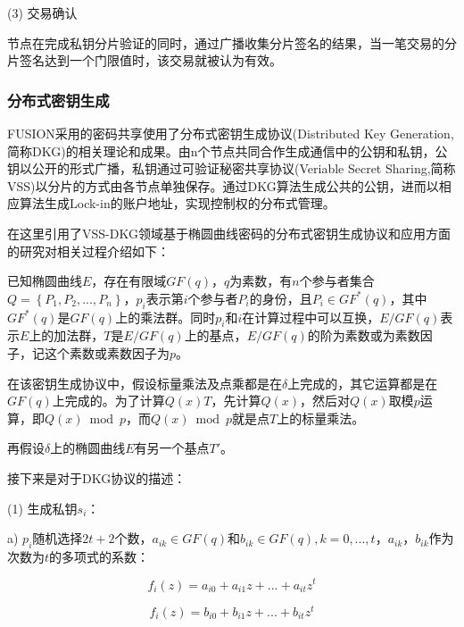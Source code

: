 \documentclass[a4paper,12pt]{article}
\begin{document}
(3) 交易确认

节点在完成私钥分片验证的同时，通过广播收集分片签名的结果，当一笔交易的分片签名达到一个门限值时，该交易就被认为有效。

\subsubsection{分布式密钥生成}

FUSION采用的密码共享\citep{Feldman1987}使用了分布式密钥生成协议(Distributed Key Generation,简称DKG)的相关理论和成果。由n个节点共同合作生成通信中的公钥和私钥，公钥以公开的形式广播，私钥通过可验证秘密共享协议(Veriable Secret Sharing,简称VSS)以分片的方式由各节点单独保存。通过DKG算法生成公共的公钥，进而以相应算法生成Lock-in的账户地址，实现控制权的分布式管理。

在这里引用了VSS-DKG领域基于椭圆曲线密码的分布式密钥生成协议和应用\citep{Wang2007}方面的研究对相关过程介绍如下：

已知椭圆曲线$E$，存在有限域$GF(q)$，$q$为素数，有$n$个参与者集合$Q = \left\{ {{P_1},{P_2},...,{P_n}} \right\}$，${p_i}$表示第$i$个参与者$P_{i}$的身份，且${P_i} \in G{F^*}\left( q \right)$，其中$G{F^*}\left( q \right)$是$GF\left( q \right)$上的乘法群。同时${p_i}$和$i$在计算过程中可以互换，$E/GF\left( q \right)$表示$E$上的加法群，$T$是$E/GF\left( q \right)$上的基点，$E/GF\left( q \right)$的阶为素数或为素数因子，记这个素数或素数因子为$p$。

在该密钥生成协议中，假设标量乘法及点乘都是在$\delta $上完成的，其它运算都是在$GF\left( q \right)$上完成的。为了计算$Q\left( x \right)T$，先计算$Q\left( x \right)$，然后对$Q\left( x \right)$取模$p$运算，即$Q\left( x \right)\bmod p$，而$Q\left( x \right)\bmod p$就是点$T$上的标量乘法。

再假设$\delta $上的椭圆曲线$E$有另一个基点$T'$。

接下来是对于DKG协议的描述：

(1) 生成私钥${s_i}$：

a) $p_{i}$随机选择$2t+2$个数，$a_{ik}\in GF(q)$和$b_{ik}\in GF(q), k=0,...,t$，$a_{ik}$，$b_{ik}$作为次数为$t$的多项式的系数：

\begin{equation}
  \label{eq:TA}
  f_i(z)=a_{i0}+a_{i1}z+...+a_{it}z^t
\end{equation}

\begin{equation}
  \label{eq:TA}
  f_i(z)=b_{i0}+b_{i1}z+...+b_{it}z^t
\end{equation}
\end{document}
